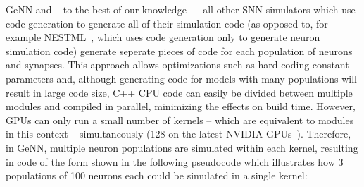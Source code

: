 \documentclass[9pt,twocolumn,twoside,lineno]{pnas-new}
\begin{document}
GeNN and -- to the best of our knowledge~\citep{Blundell2018} -- all other SNN simulators which use code generation to generate all of their simulation code (as opposed to, for example NESTML~\citep{Plotnikov2016}, which uses code generation only to generate neuron simulation code) generate seperate pieces of code for each population of neurons and synapses.
This approach allows optimizations such as hard-coding constant parameters and, although generating code for models with many populations will result in large code size, C++ CPU code can easily be divided between multiple modules and compiled in parallel, minimizing the effects on build time.
However, GPUs can only run a small number of kernels -- which are equivalent to modules in this context --  simultaneously (128 on the latest NVIDIA GPUs~\citep[p278]{NVIDIACorporation2019}).
Therefore, in GeNN, multiple neuron populations are simulated within each kernel, resulting in code of the form shown in the following pseudocode which illustrates how 3 populations of 100 neurons each could be simulated in a single kernel:
\end{document}
